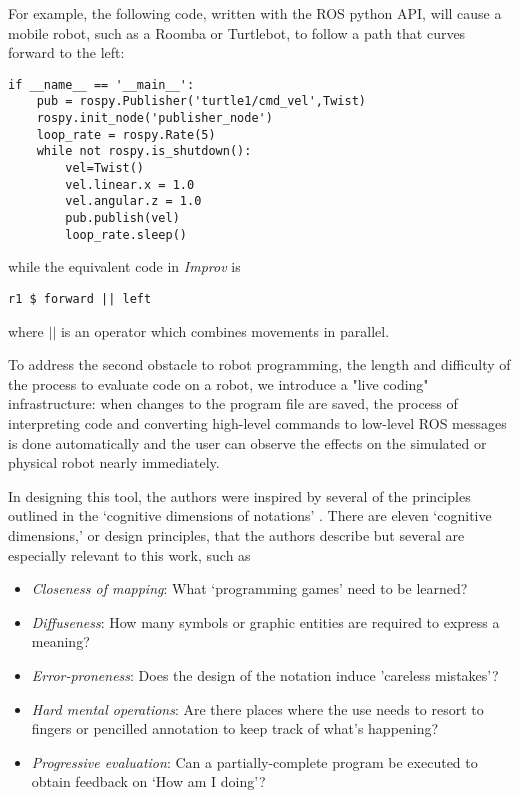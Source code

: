 \documentclass[sigconf]{acmart}
\begin{document}
For example, the following code, written with the ROS python API, will cause a
mobile robot, such as a Roomba or Turtlebot, to follow a path that curves
forward to the left:

\begin{verbatim}
if __name__ == '__main__':
    pub = rospy.Publisher('turtle1/cmd_vel',Twist)
    rospy.init_node('publisher_node')
    loop_rate = rospy.Rate(5)
    while not rospy.is_shutdown():
        vel=Twist()
        vel.linear.x = 1.0
        vel.angular.z = 1.0
        pub.publish(vel)
        loop_rate.sleep()
\end{verbatim}

while the equivalent code in \emph{Improv} is

\begin{verbatim}
r1 $ forward || left
\end{verbatim}

where $||$ is an operator which combines movements in parallel.

To address the second obstacle to robot programming, the length and difficulty
of the process to evaluate code on a robot, we introduce a "live coding"
infrastructure: when changes to the program file are saved, the process of
interpreting code and converting high-level commands to low-level ROS messages
is done automatically and the user can observe the effects on the simulated or
physical robot nearly immediately.

In designing this tool, the authors were inspired by several of the principles
outlined in the `cognitive dimensions of notations' \cite{green1996usability}.
There are eleven `cognitive dimensions,' or design principles, that the authors
describe but several are especially relevant to this work, such as

\begin{itemize}
\item \emph{Closeness of mapping}: What `programming games' need to be learned?
\item \emph{Diffuseness}: How many symbols or graphic entities are required to express a meaning?
\item \emph{Error-proneness}: Does the design of the notation induce 'careless mistakes'?
\item \emph{Hard mental operations}: Are there places where the use needs to resort to  fingers or pencilled annotation to keep track of what's happening?
\item \emph{Progressive evaluation}: Can a partially-complete program be executed to
obtain feedback on `How am I doing'?
\end{itemize}
\end{document}
